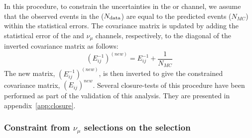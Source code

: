 In this procedure, to constrain the uncertainties in the \npsel or \zpsel channel, we assume that the observed events in the \numu ($N_{\rm data}$) are equal to the predicted events ($N_{MC}$) within the statistical errors. The covariance matrix is updated by adding the statistical error of the \zpsel and $\nu_\mu$ channels, respectively, to the diagonal of the inverted covariance matrix as follows:
\begin{equation}
    (E_{ij}^{-1})^{(new)} = E_{ij}^{-1} + \frac{1}{N_{MC}} 
\end{equation}
The new matrix, $(E_{ij}^{-1})^{(new)}$, is then inverted to give the constrained covariance matrix, $(E_{ij})^{new}$.
Several closure-tests of this procedure have been performed as part of the validation of this analysis. They are presented in appendix~\ref{app:closure}. 


\subsubsection{Constraint from $\nu_\mu$ selections on the \npsel selection}
\label{subsec:constraintfromnumu}

